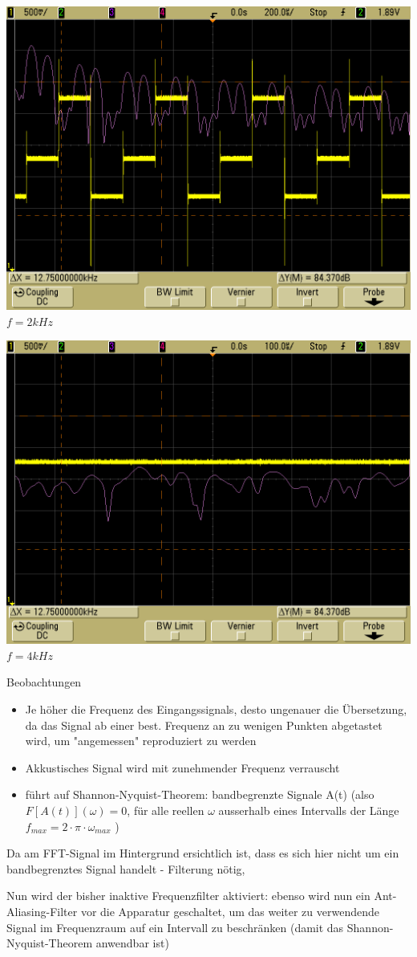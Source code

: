 \documentclass[compress,11pt]{beamer}
\begin{document}
\begin{frame}
\includegraphics[width=.7\textwidth]{../scope_64}\\
$f = 2 kHz$
\end{frame}
\begin{frame}\includegraphics[width=.7\textwidth]{../scope_65}\\
$f = 4 kHz$
\end{frame}
\begin{frame}
\begin{block}{Beobachtungen}
\begin{itemize}
\item Je höher die Frequenz des Eingangssignals, desto ungenauer die Übersetzung, da das Signal ab einer best. Frequenz an zu wenigen Punkten abgetastet wird, um "angemessen" reproduziert zu werden
\item Akkustisches Signal wird mit zunehmender Frequenz verrauscht
\item führt auf Shannon-Nyquist-Theorem: bandbegrenzte Signale A(t) (also $F[A(t)] ( \omega ) = 0 $, für alle reellen $\omega$ ausserhalb eines Intervalls der Länge $f_{max} = 2 \cdot \pi \cdot \omega_{max}$ )
\end{itemize}
\end{block}
Da am FFT-Signal im Hintergrund ersichtlich ist, dass es sich hier nicht um ein bandbegrenztes Signal handelt - Filterung nötig, 
\end{frame}
\begin{frame}
Nun wird der bisher inaktive Frequenzfilter aktiviert: ebenso wird nun ein Ant-Aliasing-Filter vor die Apparatur geschaltet, um das weiter zu verwendende Signal im Frequenzraum auf ein Intervall zu beschränken (damit das Shannon-Nyquist-Theorem anwendbar ist)
\\

\end{frame}
\end{document}
